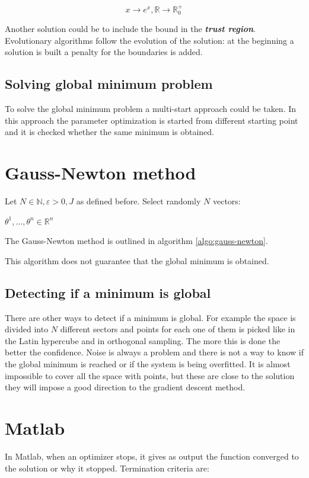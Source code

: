   $$x \rightarrow e^x, \mathbb{R} \rightarrow \mathbb{R}_0^+$$

  Another solution could be to include the bound in the \textbf{\emph{trust region}}.
  Evolutionary algorithms follow the evolution of the solution: at the beginning a solution is built a penalty for the boundaries is added.

  \subsection{Solving global minimum problem}
  To solve the global minimum problem a multi-start approach could be taken.
  In this approach the parameter optimization is started from different starting point and it is checked whether the same minimum is obtained.

\section{Gauss-Newton method}
Let $N \in \mathbb{N}, \varepsilon > 0, J$ as defined before.
Select randomly $N$ vectors:

$\theta^1, \dots, \theta^n \in \mathbb{R}^n$

The Gauss-Newton method is outlined in algorithm \ref{algo:gauss-newton}.



This algorithm does not guarantee that the global minimum is obtained.

  \subsection{Detecting if a minimum is global}
  There are other ways to detect if a minimum is global.
  For example the space is divided into $N$ different sectors and points for each one of them is picked like in the Latin hypercube and in orthogonal sampling.
  The more this is done the better the confidence.
  Noise is always a problem and there is not a way to know if the global minimum is reached or if the system is being overfitted.
  It is almost impossible to cover all the space with points, but these are close to the solution they will impose a good direction to the gradient descent method.


\section{Matlab}
In Matlab, when an optimizer stops, it gives as output the function converged to the solution or why it stopped.
Termination criteria are:

